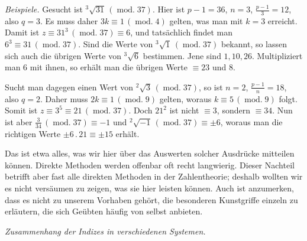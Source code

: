 \emph{Beispiele.} Gesucht ist ${}^{3}\!\surd{31}\,(\operatorname{mod.}37)$. Hier ist $p-1=36$, $n=3$, $\frac{p-1}{3}=12$, also $q=3$. Es muss daher $3k\equiv1\,(\operatorname{mod.}4)$ gelten, was man mit $k=3$ erreicht. Damit ist $z\equiv31^3\,(\operatorname{mod.}37)\equiv6$, und tatsächlich findet man $6^3\equiv31\,(\operatorname{mod.}37)$. Sind die Werte von ${}^{3}\!\surd{1}\,(\operatorname{mod.}37)$ bekannt, so lassen sich auch die übrigen Werte von ${}^{3}\!\surd{6}$ bestimmen. Jene sind $1,10,26$. Multipliziert man $6$ mit ihnen, so erhält man die übrigen Werte $\equiv23$ und $8$.

Sucht man dagegen einen Wert von ${}^{2}\!\surd{3}\,(\operatorname{mod.}37)$, so ist $n=2$, $\frac{p-1}{n}=18$, also $q=2$. Daher muss $2k\equiv1\,(\operatorname{mod.}9)$ gelten, woraus $k\equiv5\,(\operatorname{mod.}9)$ folgt. Somit ist $z\equiv3^5\equiv21\,(\operatorname{mod.}37)$. Doch $21^2$ ist nicht $\equiv3$, sondern $\equiv34$. Nun ist aber $\frac{3}{34}\,(\operatorname{mod.}37)\equiv-1$ und ${}^{2}\!\surd{-1}\,(\operatorname{mod.}37)\equiv\pm6$, woraus man die richtigen Werte $\pm6\,.\,21\equiv\pm15$ erhält.

Das ist etwa alles, was wir hier über das Auswerten solcher Ausdrücke mitteilen können. Direkte Methoden werden offenbar oft recht langwierig. Dieser Nachteil betrifft aber fast alle direkten Methoden in der Zahlentheorie; deshalb wollten wir es nicht versäumen zu zeigen, was sie hier leisten können. Auch ist anzumerken, dass es nicht zu unserem Vorhaben gehört, die besonderen Kunstgriffe einzeln zu erläutern, die sich Geübten häufig von selbst anbieten.

\begin{center}\emph{Zusammenhang der Indizes in verschiedenen Systemen.}\end{center}

